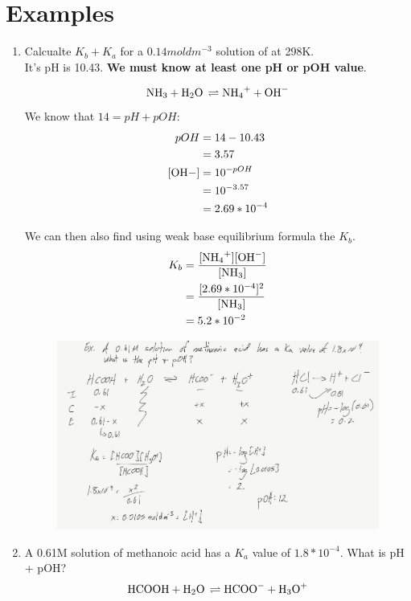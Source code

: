 \documentclass{article}
\begin{document}
\section{Examples}
\begin{enumerate}
\item Calcualte $K_{b} + K_{a}$ for a $0.14 mol dm^{-3}$ solution of  at 298K.\\It's pH is 10.43. \textbf{We must know at least one pH or pOH value}. 

$$\ce{NH3 + H2O \rightleftharpoons NH4+ + OH-}$$
We know that $14 = pH + pOH$:
\begin{align*}
pOH &= 14 - 10.43\\
&= 3.57\\
\ce{[OH-]} &= 10^{-pOH}\\
&= 10^{-3.57}\\
&= 2.69 * 10^{-4}
\end{align*}

We can then also find using weak base equilibrium formula the $K_{b}$.
\begin{align*}
K_{b} &= \frac{[\ce{NH4+}][\ce{OH-}]}{[\ce{NH3}]}\\
&= \frac{[2.69*10^{-4}]^{2}}{[\ce{NH3}]}\\
&= 5.2*10^{-2}
\end{align*}

\begin{figure}[H]
\includegraphics[width=\textwidth]{4.4ex2.jpg}
\end{figure}

\item A 0.61M solution of methanoic acid has a $K_{a}$ value of $1.8*10^{-4}$. What is pH + pOH?
$$\ce{HCOOH + H2O \rightleftharpoons HCOO- + H3O+}$$


\end{enumerate}
\end{document}

